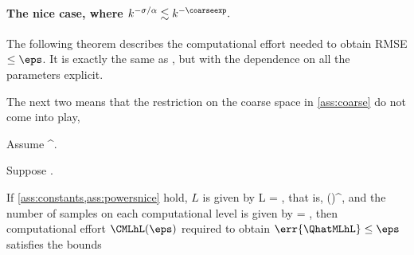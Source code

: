  \paragraph{The nice case, where $k^{-\sigma/\alpha} \lesssim k^{-\coarseexp}.$}
 The following theorem describes the computational effort needed to obtain RMSE $\leq \eps$. It is exactly the same as \cite[Theorem 1]{ClGiScTe:11}, but with the dependence on all the parameters explicit.%

  The next two  means that the restriction on the coarse space in \cref{ass:coarse} do not come into play,

 \label{ass:constants}
 Assume
 \beqs
\eps \leq {} \co \Ccoarse^{\alpha}.
 \eeqs
 \eas

 \bas\label{ass:powersnice}
 Suppose
 \beqs
\frac{\sigma}{\alpha} \geq \coarseexp.
 \eeqs
 \eas
 
 \label{thm:mlmccomp}
If \cref{ass:constants,ass:powersnice} hold, $L$ is given by
\beq\label{eq:Lcond}
L = ,
\eeq
that is,
\beqs
\hL \leq \mleft(\mright)^{\alpha},
\eeqs
and the number of samples on each computational level is given by
\beqs
\Nl = ,
\eeqs
then computational effort $\CMLhL(\eps)$ required to obtain $\err{\QhatMLhL} \leq \eps$ satisfies the bounds
 
